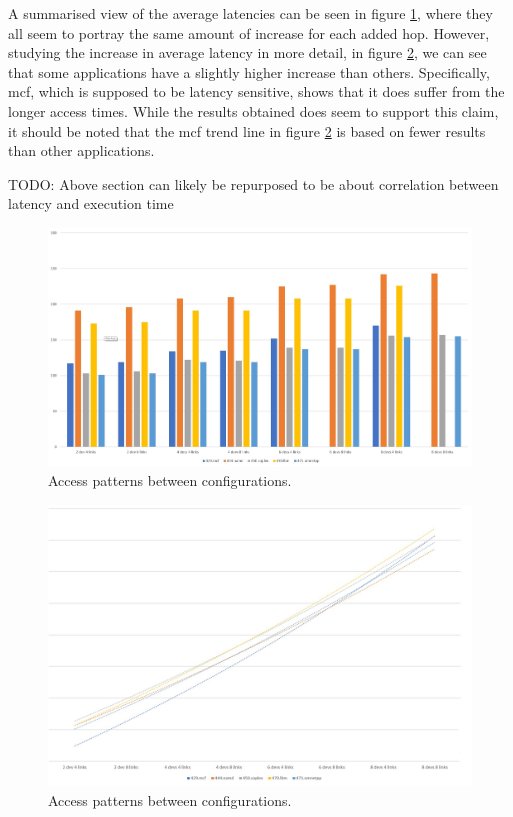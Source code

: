 A summarised view of the average latencies can be seen in figure \ref{All-apps-latency}, where they all seem to portray the same amount of increase for each added hop. However, studying the increase in average latency in more detail, in figure \ref{All-apps-latency-trends}, we can see that some applications have a slightly higher increase than others. Specifically, mcf, which is supposed to be latency sensitive, shows that it does suffer from the longer access times. While the results obtained does seem to support this claim, it should be noted that the mcf trend line in figure \ref{All-apps-latency-trends} is based on fewer results than other applications.
\bigskip

TODO: Above section can likely be repurposed to be about correlation between latency and execution time

\begin{figure}[!ht]
    \centering
    \includegraphics[width=0.75\linewidth]{figure/all-apps-latencies.jpg}
    \caption{Access patterns between configurations.}
    \label{All-apps-latency}
\end{figure}

\begin{figure}[!ht]
    \centering
    \includegraphics[width=0.75\linewidth]{figure/all-apps-latencies-trends.jpg}
    \caption{Access patterns between configurations.}
    \label{All-apps-latency-trends}
\end{figure}

